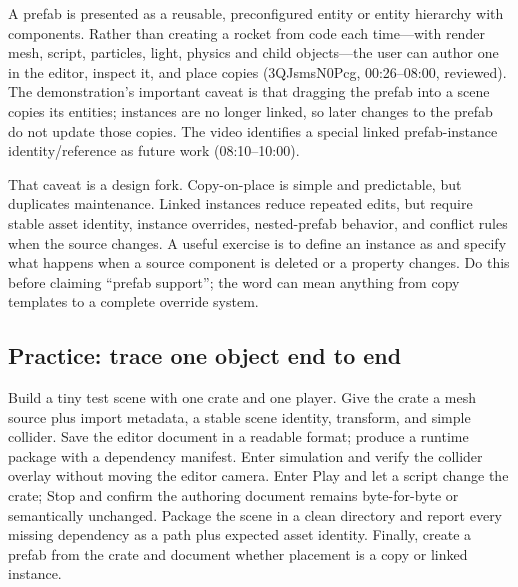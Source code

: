 \hypertarget{06-engine-ii-ch033-prefabs-and-iteration-shift-design-cost-to-identity-management}{}

A prefab is presented as a reusable, preconfigured entity or entity hierarchy with components. Rather than creating a rocket from code each time---with render mesh, script, particles, light, physics and child objects---the user can author one in the editor, inspect it, and place copies (3QJsmsN0Pcg, 00:26--08:00, reviewed). The demonstration's important caveat is that dragging the prefab into a scene copies its entities; instances are no longer linked, so later changes to the prefab do not update those copies. The video identifies a special linked prefab-instance identity/reference as future work (08:10--10:00).

That caveat is a design fork. Copy-on-place is simple and predictable, but duplicates maintenance. Linked instances reduce repeated edits, but require stable asset identity, instance overrides, nested-prefab behavior, and conflict rules when the source changes. A useful exercise is to define an instance as  and specify what happens when a source component is deleted or a property changes. Do this before claiming ``prefab support''; the word can mean anything from copy templates to a complete override system.

\begin{allmightroleexercise}

\subsection{Practice: trace one object end to end}\label{06-engine-ii-ch033-practice-trace-one-object-end-to-end}

\hypertarget{06-engine-ii-ch033-practice-trace-one-object-end-to-end}{}

Build a tiny test scene with one crate and one player. Give the crate a mesh source plus import metadata, a stable scene identity, transform, and simple collider. Save the editor document in a readable format; produce a runtime package with a dependency manifest. Enter simulation and verify the collider overlay without moving the editor camera. Enter Play and let a script change the crate; Stop and confirm the authoring document remains byte-for-byte or semantically unchanged. Package the scene in a clean directory and report every missing dependency as a path plus expected asset identity. Finally, create a prefab from the crate and document whether placement is a copy or linked instance.

\end{allmightroleexercise}

